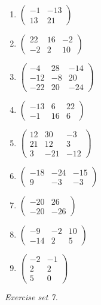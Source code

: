 \begin{enumerate}[label=\arabic*., leftmargin=*, itemsep=1pt]
\item $\left(\begin{smallmatrix}-1 & -13\\ 13 & 21\end{smallmatrix}\right)$
\item $\left(\begin{smallmatrix}22 & 16 & -2\\ -2 & 2 & 10\end{smallmatrix}\right)$
\item $\left(\begin{smallmatrix}-4 & 28 & -14\\ -12 & -8 & 20\\ -22 & 20 & -24\end{smallmatrix}\right)$
\item $\left(\begin{smallmatrix}-13 & 6 & 22\\ -1 & 16 & 6\end{smallmatrix}\right)$
\item $\left(\begin{smallmatrix}12 & 30 & -3\\ 21 & 12 & 3\\ 3 & -21 & -12\end{smallmatrix}\right)$
\item $\left(\begin{smallmatrix}-18 & -24 & -15\\ 9 & -3 & -3\end{smallmatrix}\right)$
\item $\left(\begin{smallmatrix}-20 & 26\\ -20 & -26\end{smallmatrix}\right)$
\item $\left(\begin{smallmatrix}-9 & -2 & 10\\ -14 & 2 & 5\end{smallmatrix}\right)$
\item $\left(\begin{smallmatrix}-2 & -1\\ 2 & 2\\ 5 & 0\end{smallmatrix}\right)$
\end{enumerate}
\par\noindent\emph{Exercise set 7.}\nopagebreak

